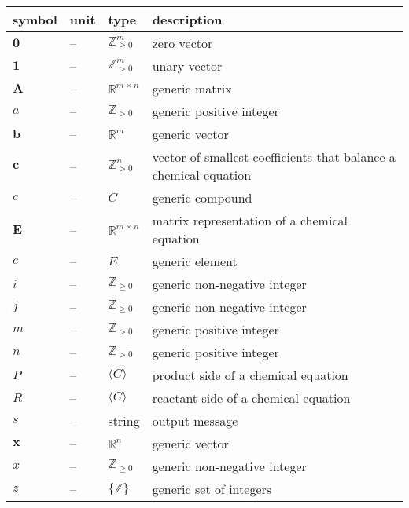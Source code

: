 \documentclass[12pt]{article}
\newcommand*{\nonnegInt}{\mathbb{Z}_{\geq 0}}
\newcommand*{\posInt}{\mathbb{Z}_{> 0}}
\begin{document}
\noindent \begin{tabularx}{\textwidth}{l l l X} \toprule
  \textbf{symbol} & \textbf{unit} & \textbf{type}             & \textbf{description}                         \\
  \midrule
  $\textbf{0}$    & --            & $\nonnegInt^{m}$          & zero vector                                  \\
  $\textbf{1}$    & --            & $\posInt^{m}$             & unary vector                                 \\
  $\textbf{A}$    & --            & $\mathbb{R}^{m \times n}$ & generic matrix                               \\
  $a$             & --            & $\posInt$                 & generic positive integer                     \\
  $\textbf{b}$    & --            & $\mathbb{R}^{m}$          & generic vector                               \\
  $\textbf{c}$    & --            & $\posInt^{n}$             & vector of smallest coefficients
  that balance a chemical equation                                                                           \\
  $c$             & --            & $C$                       & generic compound                             \\
  $\textbf{E}$    & --            & $\mathbb{R}^{m \times n}$ & matrix representation of a chemical equation \\
  $e$             & --            & $E$                       & generic element                              \\
  $i$             & --            & $\nonnegInt$              & generic non-negative integer                 \\
  $j$             & --            & $\nonnegInt$              & generic non-negative integer                 \\
  $m$             & --            & $\posInt$                 & generic positive integer                     \\
  $n$             & --            & $\posInt$                 & generic positive integer                     \\
  $P$             & --            & $\langle C \rangle$       & product side of a chemical equation          \\
  $R$             & --            & $\langle C \rangle$       & reactant side of a chemical equation         \\
  $s$             & --            & string                    & output message                               \\
  $\textbf{x}$    & --            & $\mathbb{R}^{n}$          & generic vector                               \\
  $x$             & --            & $\nonnegInt$              & generic non-negative integer                 \\
  $z$             & --            & $\{ \mathbb{Z} \}$        & generic set of integers                      \\
  \bottomrule
\end{tabularx}
\end{document}
